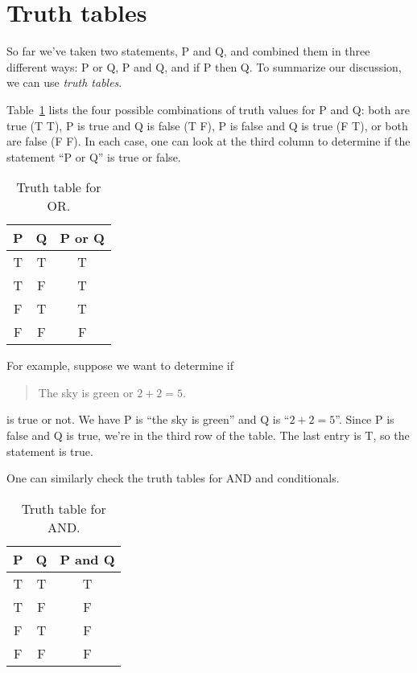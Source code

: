 \documentclass{tufte-book}
\begin{document}


\section{Truth tables}
\label{sec:truth-tables}

So far we've taken two statements, P and Q, and combined them in three different ways: P or Q, P and Q, and if P then Q. To summarize our discussion, we can use \emph{truth tables}. 

Table~\ref{tab:truth-table-or} lists the four possible combinations of truth values for P and Q: both are true (T T), P is true and Q is false (T F), P is false and Q is true (F T), or both are false (F F). In each case, one can look at the third column to determine if the statement ``P or Q'' is true or false.
\begin{table}
  \centering
  \begin{tabular}{ccc}
    \toprule
    P & Q & P or Q \\ \midrule
    T & T & T \\
    T & F & T \\
    F & T & T \\
    F & F & F \\ \bottomrule
  \end{tabular}
  \caption{Truth table for OR.}
  \label{tab:truth-table-or}
\end{table}

For example, suppose we want to determine if 
\begin{quote}
  The sky is green or $2 + 2 = 5$.
\end{quote}
is true or not. We have P is ``the sky is green'' and Q is ``$2 + 2 = 5$''. Since P is false and Q is true, we're in the third row of the table. The last entry is T, so the statement is true.

One can similarly check the truth tables for AND and conditionals.

\begin{table}
  \centering
  \begin{tabular}{ccc}
    \toprule
    P & Q & P and Q \\ \midrule
    T & T & T \\
    T & F & F \\
    F & T & F \\
    F & F & F \\ \bottomrule
  \end{tabular}
  \caption{Truth table for AND.}
  \label{tab:truth-table-and}
\end{table}
\end{document}
